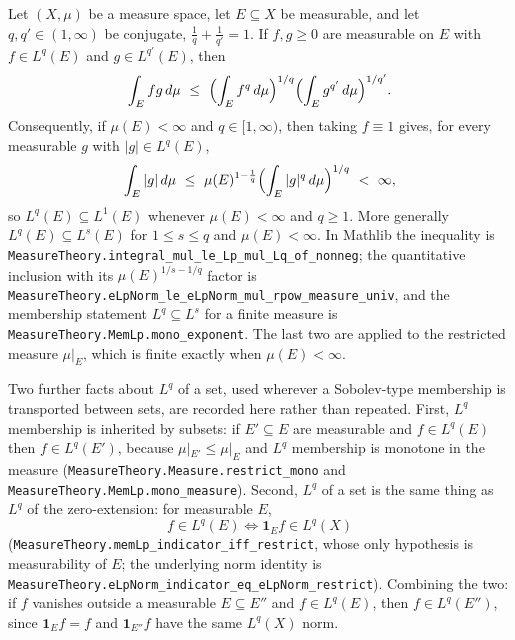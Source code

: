 \begin{proposition}
Let $(X,\mu)$ be a measure space, let $E\subseteq X$ be measurable, and let
$q,q'\in(1,\infty)$ be conjugate, $\tfrac1q+\tfrac1{q'}=1$.  If $f,g\ge0$ are
measurable on $E$ with $f\in L^{q}(E)$ and $g\in L^{q'}(E)$, then
\[
\int_E fg\,d\mu\ \le\ \Bigl(\int_E f^{q}\,d\mu\Bigr)^{1/q}
\Bigl(\int_E g^{q'}\,d\mu\Bigr)^{1/q'} .
\]
Consequently, if $\mu(E)<\infty$ and $q\in[1,\infty)$, then taking $f\equiv1$
gives, for every measurable $g$ with $|g|\in L^{q}(E)$,
\[
\int_E|g|\,d\mu\ \le\ \mu(E)^{1-\frac1q}\Bigl(\int_E|g|^{q}\,d\mu\Bigr)^{1/q}
\ <\ \infty ,
\]
so $L^{q}(E)\subseteq L^{1}(E)$ whenever $\mu(E)<\infty$ and $q\ge1$.  More
generally $L^{q}(E)\subseteq L^{s}(E)$ for $1\le s\le q$ and $\mu(E)<\infty$.
In Mathlib the inequality is
\texttt{MeasureTheory.integral\_mul\_le\_Lp\_mul\_Lq\_of\_nonneg}; the
quantitative inclusion with its $\mu(E)^{1/s-1/q}$ factor is
\texttt{MeasureTheory.eLpNorm\_le\_eLpNorm\_mul\_rpow\_measure\_univ}, and the
membership statement $L^{q}\subseteq L^{s}$ for a finite measure is
\texttt{MeasureTheory.MemLp.mono\_exponent}.  The last two are applied to the
restricted measure $\mu|_E$, which is finite exactly when $\mu(E)<\infty$.

Two further facts about $L^{q}$ of a set, used wherever a Sobolev-type
membership is transported between sets, are recorded here rather than repeated.
First, $L^{q}$ membership is inherited by subsets: if $E'\subseteq E$ are
measurable and $f\in L^{q}(E)$ then $f\in L^{q}(E')$, because
$\mu|_{E'}\le\mu|_{E}$ and $L^{q}$ membership is monotone in the measure
(\texttt{MeasureTheory.Measure.restrict\_mono} and
\texttt{MeasureTheory.MemLp.mono\_measure}).  Second, $L^{q}$ of a set is the
same thing as $L^{q}$ of the zero-extension: for measurable $E$,
\[
f\in L^{q}(E)\iff \mathbf1_Ef\in L^{q}(X)
\]
(\texttt{MeasureTheory.memLp\_indicator\_iff\_restrict}, whose only hypothesis
is measurability of $E$; the underlying norm identity is
\texttt{MeasureTheory.eLpNorm\_indicator\_eq\_eLpNorm\_restrict}).  Combining the
two: if $f$ vanishes outside a measurable $E\subseteq E''$ and $f\in L^{q}(E)$,
then $f\in L^{q}(E'')$, since $\mathbf1_Ef=f$ and
$\mathbf1_{E''}f$ have the same $L^q(X)$ norm.
\end{proposition}

